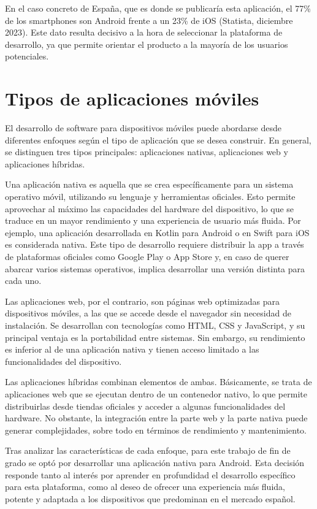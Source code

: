 En el caso concreto de España, que es donde se publicaría esta aplicación, el 77\% de los smartphones son Android frente a un 23\% de iOS (Statista, diciembre 2023). Este dato resulta decisivo a la hora de seleccionar la plataforma de desarrollo, ya que permite orientar el producto a la mayoría de los usuarios potenciales.

\section{Tipos de aplicaciones móviles}

El desarrollo de software para dispositivos móviles puede abordarse desde diferentes enfoques según el tipo de aplicación que se desea construir. En general, se distinguen tres tipos principales: aplicaciones nativas, aplicaciones web y aplicaciones híbridas.

Una aplicación nativa es aquella que se crea específicamente para un sistema operativo móvil, utilizando su lenguaje y herramientas oficiales. Esto permite aprovechar al máximo las capacidades del hardware del dispositivo, lo que se traduce en un mayor rendimiento y una experiencia de usuario más fluida. Por ejemplo, una aplicación desarrollada en Kotlin para Android o en Swift para iOS es considerada nativa. Este tipo de desarrollo requiere distribuir la app a través de plataformas oficiales como Google Play o App Store y, en caso de querer abarcar varios sistemas operativos, implica desarrollar una versión distinta para cada uno.

Las aplicaciones web, por el contrario, son páginas web optimizadas para dispositivos móviles, a las que se accede desde el navegador sin necesidad de instalación. Se desarrollan con tecnologías como HTML, CSS y JavaScript, y su principal ventaja es la portabilidad entre sistemas. Sin embargo, su rendimiento es inferior al de una aplicación nativa y tienen acceso limitado a las funcionalidades del dispositivo.

Las aplicaciones híbridas combinan elementos de ambas. Básicamente, se trata de aplicaciones web que se ejecutan dentro de un contenedor nativo, lo que permite distribuirlas desde tiendas oficiales y acceder a algunas funcionalidades del hardware. No obstante, la integración entre la parte web y la parte nativa puede generar complejidades, sobre todo en términos de rendimiento y mantenimiento.

Tras analizar las características de cada enfoque, para este trabajo de fin de grado se optó por desarrollar una aplicación nativa para Android. Esta decisión responde tanto al interés por aprender en profundidad el desarrollo específico para esta plataforma, como al deseo de ofrecer una experiencia más fluida, potente y adaptada a los dispositivos que predominan en el mercado español.

